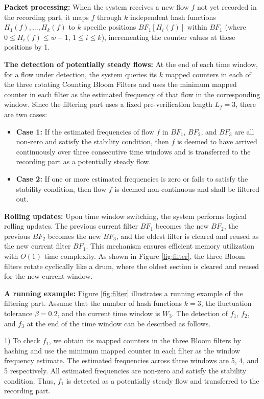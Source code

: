 \documentclass[preprint,12pt]{elsarticle}
\begin{document}
\textbf{Packet processing:} When the system receives a new flow $f$ not yet recorded in the recording part, it maps $f$ through $k$ independent hash functions $H_1(f), ..., H_k(f)$ to $k$ specific positions $BF_1[H_i(f)]$ within $BF_1$ (where $0 \le H_i(f) \le w-1$, $1 \le i \le k$), incrementing the counter values at these positions by 1.

\textbf{The detection of potentially steady flows:} At the end of each time window, for a flow under detection, the system queries its $k$ mapped counters in each of the three rotating Counting Bloom Filters and uses the minimum mapped counter in each filter as the estimated frequency of that flow in the corresponding window. Since the filtering part uses a fixed pre-verification length $L_f=3$, there are two cases:
\begin{itemize}
    \item \textbf{Case 1:} If the estimated frequencies of flow $f$ in $BF_1$, $BF_2$, and $BF_3$ are all non-zero and satisfy the stability condition, then $f$ is deemed to have arrived continuously over three consecutive time windows and is transferred to the recording part as a potentially steady flow.
    \item \textbf{Case 2:} If one or more estimated frequencies is zero or fails to satisfy the stability condition, then flow $f$ is deemed non-continuous and shall be filtered out.
\end{itemize}

\textbf{Rolling updates:} Upon time window switching, the system performs logical rolling updates. The previous current filter $BF_1$ becomes the new $BF_2$, the previous $BF_2$ becomes the new $BF_3$, and the oldest filter is cleared and reused as the new current filter $BF_1$. This mechanism ensures efficient memory utilization with $O(1)$ time complexity. As shown in Figure \ref{fig:filter}, the three Bloom filters rotate cyclically like a drum, where the oldest section is cleared and reused for the new current window.

\textbf{A running example:} Figure \ref{fig:filter} illustrates a running example of the filtering part. Assume that the number of hash functions $k = 3$, the fluctuation tolerance $\beta = 0.2$, and the current time window is $W_3$. The detection of $f_1$, $f_2$, and $f_3$ at the end of the time window can be described as follows.

1) To check $f_1$, we obtain its mapped counters in the three Bloom filters by hashing and use the minimum mapped counter in each filter as the window frequency estimate. The estimated frequencies across three windows are 5, 4, and 5 respectively. All estimated frequencies are non-zero and satisfy the stability condition. Thus, $f_1$ is detected as a potentially steady flow and transferred to the recording part.
\end{document}
